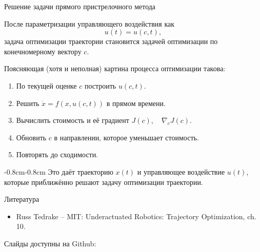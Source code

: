 \documentclass{beamer}
\newcommand{\myqrframe}{
	\begin{frame}
		\begin{center}
			\centerline{Слайды доступны на Github:}
			\bigskip
			\centerline{\mygit}
			\bigskip
			\myqr
		\end{center}
	\end{frame}
}
\begin{document}
	
	\begin{frame}{Решение задачи прямого пристрелочного метода}
		\begin{flushleft}
			После параметризации управляющего воздействия как
			\[
			u(t)=u(c,t),
			\]
			задача оптимизации траектории становится задачей оптимизации
			по конечномерному вектору $c$.
			
			\vspace{0.5em}
			
			Поясняющая (хотя и неполная) картина
			процесса оптимизации такова:
			
			\begin{enumerate}
				\item По текущей оценке $c$ построить
				$u(c,t)$.
				
				\item Решить $\dot{x}=f(x,u(c,t))$ в прямом времени.
				
				\item Вычислить стоимость и её градиент $J(c),
				\quad
				\nabla_c J(c)$.
				
				\item Обновить $c$ в направлении, которое уменьшает стоимость.
				
				\item Повторять до сходимости.
			\end{enumerate}
			
			\vspace{0.5em}
\begin{adjustwidth}{-0.8cm}{-0.8cm}
	Это даёт траекторию $x(t)$ и управляющее воздействие $u(t)$,
	которые приближённо решают задачу оптимизации траектории.
\end{adjustwidth}
		\end{flushleft}
	\end{frame}

\begin{frame}{Литература}
	
	\begin{itemize}
		
		
		\item Russ Tedrake -- MIT:
		{Underactuated Robotics: Trajectory Optimization, ch. 10.}
		
	\end{itemize}
	
\end{frame}



\myqrframe
\end{document}
